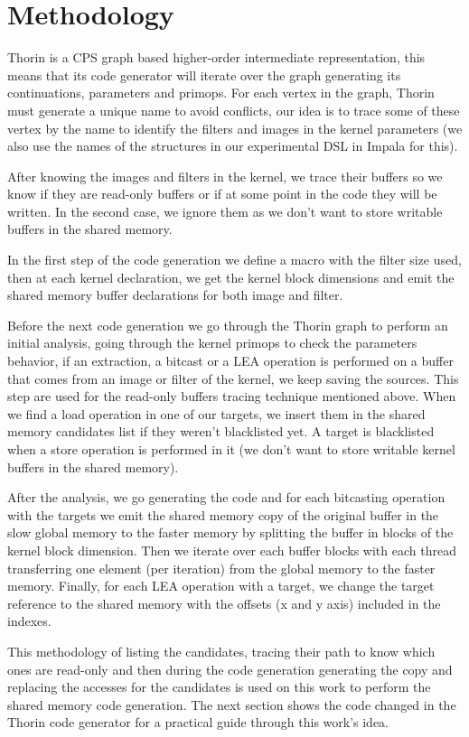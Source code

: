 \documentclass{article}
\begin{document}
\section{Methodology}
Thorin is a CPS graph based higher-order intermediate representation, this means that its code generator will iterate over the graph generating its continuations, parameters and primops. For each vertex in the graph, Thorin must generate a unique name to avoid conflicts, our idea is to trace some of these vertex by the name to identify the filters and images in the kernel parameters (we also use the names of the structures in our experimental DSL in Impala for this).

After knowing the images and filters in the kernel, we trace their buffers so we know if they are read-only buffers or if at some point in the code they will be written. In the second case, we ignore them as we don't want to store writable buffers in the shared memory.

In the first step of the code generation we define a macro with the filter size used, then at each kernel declaration, we get the kernel block dimensions and emit the shared memory buffer declarations for both image and filter.

Before the next code generation we go through the Thorin graph to perform an initial analysis, going through the kernel primops to check the parameters behavior, if an extraction, a bitcast or a LEA operation is performed on a buffer that comes from an image or filter of the kernel, we keep saving the sources. This step are used for the read-only buffers tracing technique mentioned above. When we find a load operation in one of our targets, we insert them in the shared memory candidates list if they weren't blacklisted yet. A target is blacklisted when a store operation is performed in it (we don't want to store writable kernel buffers in the shared memory).

After the analysis, we go generating the code and for each bitcasting operation with the targets we emit the shared memory copy of the original buffer in the slow global memory to the faster memory by splitting the buffer in blocks of the kernel block dimension. Then we iterate over each buffer blocks with each thread transferring one element (per iteration) from the global memory to the faster memory. Finally, for each LEA operation with a target, we change the target reference to the shared memory with the offsets (x and y axis) included in the indexes.

This methodology of listing the candidates, tracing their path to know which ones are read-only and then during the code generation generating the copy and replacing the accesses for the candidates is used on this work to perform the shared memory code generation. The next section shows the code changed in the Thorin code generator for a practical guide through this work's idea.
\end{document}
